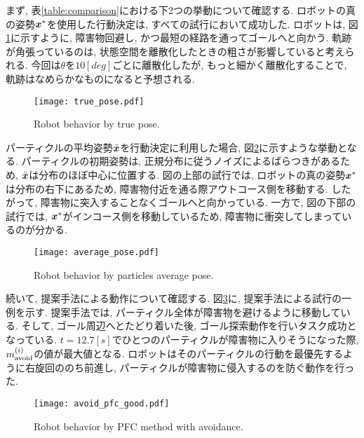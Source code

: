 まず, 表\ref{table:comparison}における下2つの挙動について確認する. 
ロボットの真の姿勢$\boldsymbol{x}^{*}$を使用した行動決定は, すべての試行において成功した. 
ロボットは, 図\ref{fig:true pose}に示すように, 障害物回避し, かつ最短の経路を通ってゴールへと向かう. 
軌跡が角張っているのは, 状態空間を離散化したときの粗さが影響していると考えられる. 
今回は$\theta$を$10[\si{deg}]$ごとに離散化したが, もっと細かく離散化することで, 軌跡はなめらかなものになると予想される. 

\begin{figure}[tbp]
  \begin{center}
    \texttt{[image: true\_pose.pdf]}
    \caption{Robot behavior by true pose.}
    \label{fig:true pose}
  \end{center}
\end{figure}

パーティクルの平均姿勢$\bar{\boldsymbol{x}}$を行動決定に利用した場合, 図\ref{fig:average pose}に示すような挙動となる. 
パーティクルの初期姿勢は, 正規分布に従うノイズによるばらつきがあるため, $\bar{\boldsymbol{x}}$は分布のほぼ中心に位置する. 
図の上部の試行では, ロボットの真の姿勢$\boldsymbol{x}^{*}$は分布の右下にあるため, 障害物付近を通る際アウトコース側を移動する. 
したがって, 障害物に突入することなくゴールへと向かっている. 
一方で, 図の下部の試行では, $\boldsymbol{x}^{*}$がインコース側を移動しているため, 障害物に衝突してしまっているのが分かる. 

\begin{figure}[tbp]
  \begin{center}
    \texttt{[image: average\_pose.pdf]}
    \caption{Robot behavior by particles average pose.}
    \label{fig:average pose}
  \end{center}
\end{figure}

続いて, 提案手法による動作について確認する. 
図\ref{fig:avoid pfc good}に, 提案手法による試行の一例を示す. 
提案手法では, パーティクル全体が障害物を避けるように移動している. 
そして, ゴール周辺へとたどり着いた後, ゴール探索動作を行いタスク成功となっている. 
$t=12.7[\si{s}]$でひとつのパーティクルが障害物に入りそうになった際, $m^{(i)}_{\rm avoid}$の値が最大値となる. 
ロボットはそのパーティクルの行動を最優先するように右旋回ののち前進し, パーティクルが障害物に侵入するのを防ぐ動作を行った. 

\begin{figure}[tbp]
  \begin{center}
    \texttt{[image: avoid\_pfc\_good.pdf]}
    \caption{Robot behavior by PFC method with avoidance.}
    \label{fig:avoid pfc good}
  \end{center}
\end{figure}

